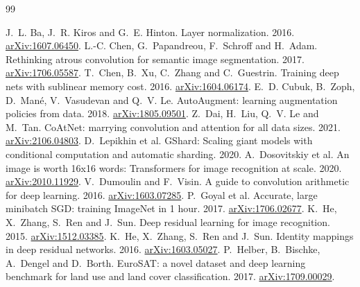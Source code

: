 \documentclass[11pt,a4paper]{article}
\begin{document}
\begin{thebibliography}{99}\small

 J.~L. Ba, J.~R. Kiros and G.~E. Hinton. Layer normalization. 2016.
  \href{https://arxiv.org/abs/1607.06450}{arXiv:1607.06450}.
 L.-C. Chen, G.~Papandreou, F.~Schroff and H.~Adam. Rethinking atrous convolution for semantic image
  segmentation. 2017. \href{https://arxiv.org/abs/1706.05587}{arXiv:1706.05587}.
 T.~Chen, B.~Xu, C.~Zhang and C.~Guestrin. Training deep nets with sublinear memory cost. 2016.
  \href{https://arxiv.org/abs/1604.06174}{arXiv:1604.06174}.
 E.~D. Cubuk, B.~Zoph, D.~Man\'e, V.~Vasudevan and Q.~V. Le. AutoAugment: learning augmentation policies
  from data. 2018. \href{https://arxiv.org/abs/1805.09501}{arXiv:1805.09501}.
 Z.~Dai, H.~Liu, Q.~V. Le and M.~Tan. CoAtNet: marrying convolution and attention for all data sizes. 2021.
  \href{https://arxiv.org/abs/2106.04803}{arXiv:2106.04803}.
 D.~Lepikhin et al. GShard: Scaling giant models with conditional computation and automatic sharding. 2020.
 A.~Dosovitskiy et al. An image is worth 16x16 words: Transformers for image recognition at scale. 2020.
  \href{https://arxiv.org/abs/2010.11929}{arXiv:2010.11929}.
 V.~Dumoulin and F.~Visin. A guide to convolution arithmetic for deep learning. 2016.
  \href{https://arxiv.org/abs/1603.07285}{arXiv:1603.07285}.
 P.~Goyal et al. Accurate, large minibatch SGD: training ImageNet in 1 hour. 2017.
  \href{https://arxiv.org/abs/1706.02677}{arXiv:1706.02677}.
 K.~He, X.~Zhang, S.~Ren and J.~Sun. Deep residual learning for image recognition. 2015.
  \href{https://arxiv.org/abs/1512.03385}{arXiv:1512.03385}.
 K.~He, X.~Zhang, S.~Ren and J.~Sun. Identity mappings in deep residual networks. 2016.
  \href{https://arxiv.org/abs/1603.05027}{arXiv:1603.05027}.
 P.~Helber, B.~Bischke, A.~Dengel and D.~Borth. EuroSAT: a novel dataset and deep learning benchmark for land
  use and land cover classification. 2017. \href{https://arxiv.org/abs/1709.00029}{arXiv:1709.00029}.


\end{thebibliography}
\end{document}
